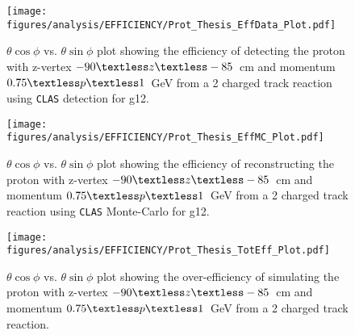 \documentclass[11pt,a4paper]{article}
\newcommand{\abbr}[1]{\textsc{\texttt{#1}}}
\def\figures{/Users/michaelkunkel/WORK/GIT_HUB/THESIS/figures/print}
\newlength{\figwidth}
\newlength{\hfigheight}
\begin{document}
\begin{figure}[h!]\begin{center}
    \texttt{[image: \\figures/analysis/EFFICIENCY/Prot\_Thesis\_EffData\_Plot.pdf]}
    \caption[$\theta \cos\phi$ vs. $\theta \sin\phi$ plot showing the efficiency of detecting the proton with z-vertex $-90\textless z\textless-85$~cm and momentum $0.75\textless p \textless 1$~GeV from a 2 charged track reaction using \abbr{CLAS} detection for g12]{\label{fig:eff_prot_data} $\theta \cos\phi$ vs. $\theta \sin\phi$ plot showing the efficiency of detecting the proton with z-vertex $-90\textless z\textless-85$~cm and momentum $0.75\textless p \textless 1$~GeV from a 2 charged track reaction using \abbr{CLAS} detection for g12.}
  \end{center}\end{figure}
%
\begin{figure}[h!]\begin{center}
    \texttt{[image: \\figures/analysis/EFFICIENCY/Prot\_Thesis\_EffMC\_Plot.pdf]}
    \caption[$\theta \cos\phi$ vs. $\theta \sin\phi$ plot showing the efficiency of reconstructing the proton with z-vertex $-90\textless z\textless-85$~cm and momentum $0.75\textless p \textless 1$~GeV from a 2 charged track reaction using \abbr{CLAS} Monte-Carlo for g12]{\label{fig:eff_prot_MC} $\theta \cos\phi$ vs. $\theta \sin\phi$ plot showing the efficiency of reconstructing the proton with z-vertex $-90\textless z\textless-85$~cm and momentum $0.75\textless p \textless 1$~GeV from a 2 charged track reaction using \abbr{CLAS} Monte-Carlo for g12.}
  \end{center}\end{figure}
%
\begin{figure}[h!]\begin{center}
    \texttt{[image: \\figures/analysis/EFFICIENCY/Prot\_Thesis\_TotEff\_Plot.pdf]}
    \caption[$\theta \cos\phi$ vs. $\theta \sin\phi$ plot showing the over-efficiency of simulating the proton with z-vertex $-90\textless z\textless-85$~cm and momentum $0.75\textless p \textless 1$~GeV from a 2 charged track reaction]{\label{fig:toteff_prot} $\theta \cos\phi$ vs. $\theta \sin\phi$ plot showing the over-efficiency of simulating the proton with z-vertex $-90\textless z\textless-85$~cm and momentum $0.75\textless p \textless 1$~GeV from a 2 charged track reaction.}
  \end{center}\end{figure}
\end{document}

